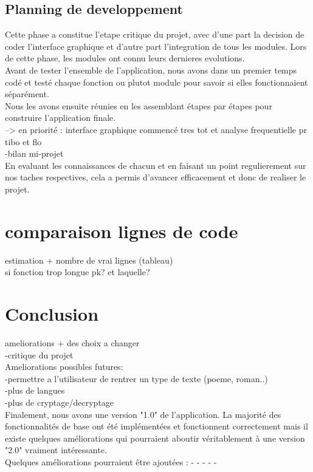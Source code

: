 \documentclass[a4]{article}
\begin{document}
		\subsection{Planning de developpement}
		Cette phase a constitue l’etape critique du projet, avec d’une part la decision de coder l’interface graphique
et d’autre part l’integration de tous les modules. Lors de cette phase, les modules ont connu leurs dernieres evolutions. \\
Avant de tester l’ensemble de l’application, nous avons dans un premier temps codé et
testé chaque fonction ou plutot module pour savoir si elles fonctionnaient séparément. \\
Nous les avons ensuite
réunies en les assemblant étapes par étapes pour construire l’application finale.  \\
--> en priorité : interface graphique commencé tres tot et analyse frequentielle pr tibo et flo \\
-bilan mi-projet \\
En evaluant les connaissances de chacun et en faisant un point regulierement sur nos taches respectives, cela a permis d'avancer efficacement et donc de realiser le projet.
	\section{comparaison lignes de code}
		estimation + nombre de vrai lignes (tableau) \\
		si fonction trop longue pk? et laquelle? \\
		
	
	\section{Conclusion}
	ameliorations + des choix a changer  \\
	-critique du projet \\
	Ameliorations possibles futures: \\
	-permettre a l'utilisateur de rentrer un type de texte (poeme, roman..) \\
	-plus de langues \\
	-plus de cryptage/decryptage \\
	
	Finalement, nous avons une version "1.0" de l’application. La majorité des fonctionnalités
de base ont été implémentées et fonctionnent correctement mais il existe quelques
améliorations qui pourraient aboutir véritablement à une version "2.0" vraiment intéressante. \\
Quelques améliorations pourraient être ajoutées :
-
- 
- 
- 
-
	
\end{document}
